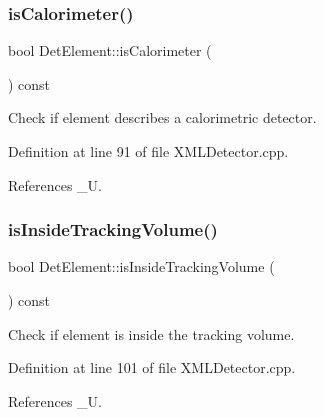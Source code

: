 \subsubsection{\texorpdfstring{is\+Calorimeter()}{isCalorimeter()}}
{\footnotesize\ttfamily bool Det\+Element\+::is\+Calorimeter (\begin{DoxyParamCaption}{ }\end{DoxyParamCaption}) const}



Check if element describes a calorimetric detector. 



Definition at line 91 of file X\+M\+L\+Detector.\+cpp.



References \+\_\+U.

\hypertarget{struct_d_d4hep_1_1_x_m_l_1_1_det_element_ae10b1a35a95e9b6d043ba37e8145f715}{}\label{struct_d_d4hep_1_1_x_m_l_1_1_det_element_ae10b1a35a95e9b6d043ba37e8145f715} 
\subsubsection{\texorpdfstring{is\+Inside\+Tracking\+Volume()}{isInsideTrackingVolume()}}
{\footnotesize\ttfamily bool Det\+Element\+::is\+Inside\+Tracking\+Volume (\begin{DoxyParamCaption}{ }\end{DoxyParamCaption}) const}



Check if element is inside the tracking volume. 



Definition at line 101 of file X\+M\+L\+Detector.\+cpp.



References \+\_\+U.

\hypertarget{struct_d_d4hep_1_1_x_m_l_1_1_det_element_a5795a49f1baaa7afaf7b98eea4e069d2}{}\label{struct_d_d4hep_1_1_x_m_l_1_1_det_element_a5795a49f1baaa7afaf7b98eea4e069d2} 
